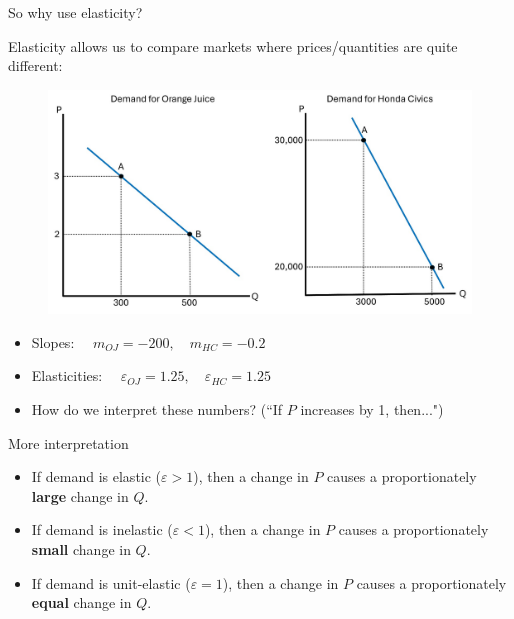 \documentclass[9pt, handout]{beamer}
\begin{document}
\begin{frame}{So why use elasticity?}

    Elasticity allows us to compare markets where prices/quantities are quite different:
    \begin{figure}
        \centering
        \includegraphics[width=.8\linewidth]{demand_curve_comparison.jpg}
        \label{fig:demand_curve_comparison}
    \end{figure}
    \begin{itemize}
        \item Slopes: $\quad m_{OJ} = -200, \quad m_{HC} = -0.2$
        \item Elasticities: $\quad \varepsilon_{OJ} = 1.25, \quad \varepsilon_{HC} = 1.25$
        \item How do we interpret these numbers? (``If $P$ increases by 1, then...")
    \end{itemize}
\end{frame}

\begin{frame}{More interpretation}
    \begin{itemize}
    \item If demand is elastic ($\varepsilon > 1$), then a change in $P$ causes a proportionately \textbf{large} change in $Q$.
    \vspace{5}
    \item If demand is inelastic ($\varepsilon < 1$), then a change in $P$ causes a proportionately \textbf{small} change in $Q$.
    \vspace{5}
    \item If demand is unit-elastic ($\varepsilon = 1$), then a change in $P$ causes a proportionately \textbf{equal} change in $Q$.
    \end{itemize}
\end{frame}
\end{document}

